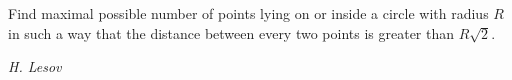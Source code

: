 Find maximal possible number of points lying on or inside a circle with radius $R$ in such a way that the distance between every two points is greater than $R\sqrt2$.

\textit{H. Lesov}